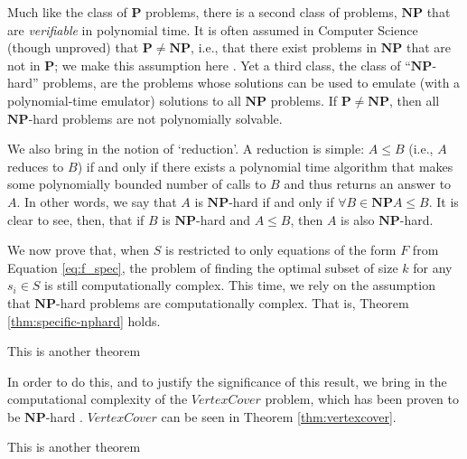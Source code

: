 Much like the class of $\mathbf{P}$ problems, there is a second class of problems, $\mathbf{NP}$ that are \textit{verifiable} in polynomial time. It is often assumed in Computer Science (though unproved) that $\mathbf{P} \neq \mathbf{NP}$, i.e., that there exist problems in $\mathbf{NP}$ that are not in $\mathbf{P}$; we make this assumption here \cite{COPPERSMITH198527}. Yet a third class, the class of ``$\mathbf{NP}$-hard'' problems, are the problems whose solutions can be used to emulate (with a polynomial-time emulator) solutions to all $\mathbf{NP}$ problems. If $\mathbf{P} \neq \mathbf{NP}$, then all $\mathbf{NP}$-hard problems are not polynomially solvable.

We also bring in the notion of `reduction'. A reduction is simple: $A \leq B$ (i.e., $A$ reduces to $B$) if and only if there exists a polynomial time algorithm that makes some polynomially bounded number of calls to $B$ and thus returns an answer to $A$. In other words, we say that $A$ is $\mathbf{NP}$-hard if and only if $\forall B \in \mathbf{NP} A \leq B$. It is clear to see, then, that if $B$ is $\mathbf{NP}$-hard and $A \leq B$, then $A$ is also $\mathbf{NP}$-hard.

We now prove that, when $S$ is restricted to only equations of the form $F$ from Equation \ref{eq:f_spec}, the problem of finding the optimal subset of size $k$ for any $s_i \in S$ is still computationally complex. This time, we rely on the assumption that $\mathbf{NP}$-hard problems are computationally complex. That is, Theorem \ref{thm:specific-nphard} holds. 

\begin{theorem}\label{thm:specific-nphard}
    This is another theorem
\end{theorem}

In order to do this, and to justify the significance of this result, we bring in the computational complexity of the $VertexCover$ problem, which has been proven to be $\mathbf{NP}$-hard \cite{COPPERSMITH198527}. $VertexCover$ can be seen in Theorem \ref{thm:vertexcover}.

\begin{theorem}\label{thm:vertexcover}
    This is another theorem
\end{theorem}

